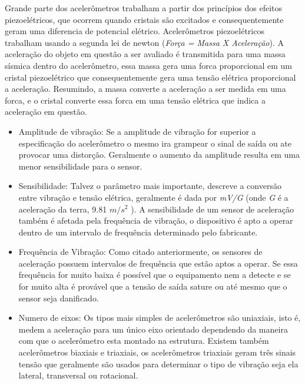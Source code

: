 Grande parte dos acelerômetros trabalham a partir dos princípios dos efeitos piezoelétricos, 
que ocorrem quando cristais são excitados e consequentemente geram uma diferencia de potencial elétrico.  
Acelerômetros piezoelétricos trabalham usando a segunda lei de newton (\textit{Força = Massa X Aceleração}). A
aceleração do objeto em questão a ser avaliado é transmitida para uma massa sísmica dentro do acelerômetro, essa massa 
gera uma forca proporcional em um cristal piezoelétrico que consequentemente gera uma tensão elétrica proporcional a aceleração.
Resumindo, a massa converte a aceleração a ser medida em uma forca, e o cristal converte essa forca em uma tensão elétrica que 
indica a aceleração em questão. 

\begin{itemize}
\item Amplitude de vibração: Se a amplitude de vibração for superior a especificação do acelerômetro o mesmo ira grampear o sinal de saída ou ate provocar uma distorção. Geralmente o aumento da amplitude resulta em uma menor sensibilidade para o sensor.
\item Sensibilidade: Talvez o parâmetro mais importante, descreve a conversão entre vibração e tensão elétrica, geralmente é dada por \textit{mV/G} (onde \textit{G} é a aceleração da terra, 9.81 $m/s^2$ ). A sensibilidade de um sensor de aceleração também é afetada pela frequência de vibração, o dispositivo é apto a operar dentro de um intervalo de frequência determinado pelo fabricante.
\item Frequência de Vibração: Como citado anteriormente, os sensores de aceleração possuem intervalos de frequência que estão aptos a operar. Se essa frequência for muito baixa é possível que o equipamento nem a detecte e se for muito alta é provável que a tensão de saída sature ou até mesmo que o sensor seja danificado.
\item Numero de eixos: Os tipos mais simples de acelerômetros são uniaxiais, isto é, medem a aceleração para um único eixo orientado dependendo da maneira com que o acelerômetro esta montado na estrutura. Existem também acelerômetros biaxiais e triaxiais, os acelerômetros triaxiais geram três sinais tensão que geralmente são usados para determinar o tipo de vibração seja ela lateral, transversal ou rotacional.
\end{itemize}

